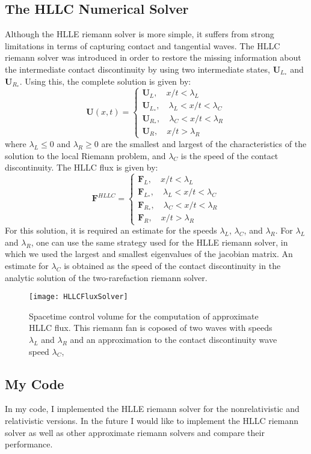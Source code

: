 \subsection{The HLLC Numerical Solver }
Although the HLLE riemann solver is more simple, it suffers from strong limitations in terms of capturing contact and tangential waves. The HLLC riemann solver was introduced in order to restore the missing information about the intermediate contact discontinuity by using two intermediate states, $\bm{U}_{L_*}$ and $\bm{U}_{R_*}$. Using this, the complete solution is given by:
$$\bm{U}(x,t)=\begin{cases}
		\bm{U}_L, \quad x/t < \lambda_L\\
		\bm{U}_{L_*}, \quad \lambda_L < x/t < \lambda_C\\
		\bm{U}_{R_*},\quad \lambda_C < x/t < \lambda_R\\
		\bm{U}_R,\quad x/t > \lambda_R
\end{cases}$$
where $\lambda_L \leq 0 $ and $\lambda_R \geq 0$ are the smallest and largest of the characteristics of the solution to the local Riemann problem, and $\lambda_C$ is the speed of the contact discontinuity. The HLLC flux is given by:
$$\bm{F}^{HLLC}=\begin{cases}
		\bm{F}_L,\quad x/t < \lambda_L\\
		\bm{F}_{L_*},\quad \lambda_L < x/t < \lambda_C\\
		\bm{F}_{R_*},\quad \lambda_C < x/t < \lambda_R \\
		\bm{F}_R,\quad x/t > \lambda_R
\end{cases}$$
For this solution, it is required an estimate for the speeds $\lambda_L$, $\lambda_C$, and $\lambda_R$. For $\lambda_L$ and $\lambda_R$, one can use the same strategy used for the HLLE riemann solver, in which we used the largest and smallest eigenvalues of the jacobian matrix. An estimate for $\lambda_C$ is obtained as the speed of the contact discontinuity in the analytic solution of the two-rarefaction riemann solver. 
\begin{figure}[h]
		\centering
		\texttt{[image: HLLCFluxSolver]}
        \caption{Spacetime control volume for the computation of approximate HLLC flux. This riemann fan is coposed of two waves with speeds $\lambda_L$ and $\lambda_R$ and an approximation to the contact discontinuity wave speed $\lambda_C$, \cite{rezzolla}}
\end{figure}

\subsection{My Code}
In my code, I implemented the HLLE riemann solver for the nonrelativistic and relativistic versions. In the future I would like to implement the HLLC riemann solver as well as other approximate riemann solvers and compare their performance. 
